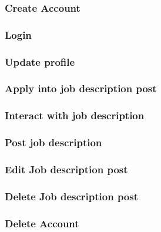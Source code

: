 \documentclass[a4paper]{article}
\begin{document}
        \subsubsection{Create Account}

        \subsubsection{Login}

        \subsubsection{Update profile}

        \subsubsection{Apply into job description post}

        \subsubsection{Interact with job description}

        \subsubsection{Post job description}

        \subsubsection{Edit Job description post}

        \subsubsection{Delete Job description post}

        \subsubsection{Delete Account}
\section{}
\end{document}
